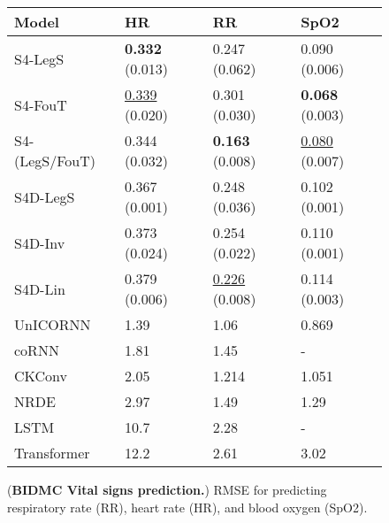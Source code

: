 \documentclass{article}
\begin{document}
\begin{figure}[!t]
\begin{minipage}[t]{0.35\linewidth}
\begin{tabular}{@{}ll@{}}
    \bottomrule
  \end{tabular}
    \label{tab:scifar-full}
\end{minipage}
\begin{minipage}[t]{0.65\linewidth}
  \small
  \centering
  \captionsetup{type=table}
  \caption{
    (\textbf{BIDMC Vital signs prediction.})
    RMSE for predicting
    respiratory rate (RR), heart rate (HR), and blood oxygen (SpO2).
  }
    \begin{tabular}{@{}llll@{}}
      \toprule
      Model                              & HR                        & RR                        & SpO2                      \\
      \midrule
      S4-LegS                            & \textbf{0.332} (0.013)    & 0.247 (0.062)             & 0.090 (0.006)             \\
      S4-FouT                            & \underline{0.339} (0.020) & 0.301 (0.030)             & \textbf{0.068} (0.003)    \\
      S4-(LegS/FouT)                     & 0.344 (0.032)             & \textbf{0.163} (0.008)    & \underline{0.080} (0.007) \\
      \midrule
      S4D-LegS                           & 0.367 (0.001)             & 0.248 (0.036)             & 0.102 (0.001)             \\
      S4D-Inv                            & 0.373 (0.024)             & 0.254 (0.022)             & 0.110 (0.001)             \\
      S4D-Lin                            & 0.379 (0.006)             & \underline{0.226} (0.008) & 0.114 (0.003)             \\
      \midrule
      UnICORNN~\citep{rusch2021unicornn} & 1.39                      & 1.06                      & 0.869                     \\
      coRNN~\citep{rusch2021unicornn}    & 1.81                      & 1.45                      & -                         \\
      CKConv                             & 2.05                      & 1.214                     & 1.051                     \\
      NRDE~\citep{morrill2021neural}     & 2.97                      & 1.49                      & 1.29                      \\
      LSTM                               & 10.7                      & 2.28                      & -                         \\
      Transformer                        & 12.2                      & 2.61                      & 3.02                      \\


\end{tabular}
\end{minipage}
\end{figure}
\end{document}

